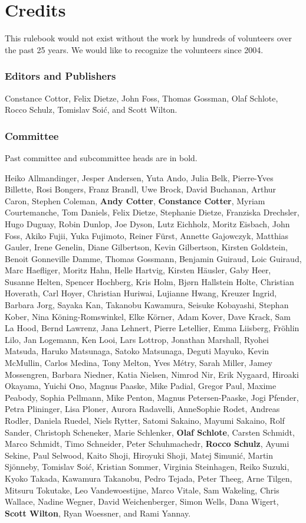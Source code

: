 \part{Credits}

This rulebook would not exist without the work by hundreds of volunteers over the past 25 years.
We would like to recognize the volunteers since 2004.

\section{Editors and Publishers}
Constance Cottor,
Felix Dietze,
John Foss,
Thomas Gossman,
Olaf Schlote,
Rocco Schulz,
Tomislav \u{S}oi\'{c},
and Scott Wilton.

\section{Committee}

Past committee and subcommittee heads are in bold.

Heiko Allmandinger,
Jesper Andersen,
Yuta Ando,
Julia Belk,
Pierre-Yves Billette,
Rosi Bongers,
Franz Brandl,
Uwe Brock,
David Buchanan,
Arthur Caron,
Stephen Coleman,
\textbf{Andy Cotter},
\textbf{Constance Cotter},
Myriam Courtemanche,
Tom Daniels,
Felix Dietze,
Stephanie Dietze,
Franziska Drechsler,
Hugo Duguay,
Robin Dunlop,
Joe Dyson,
Lutz Eichholz,
Moritz Eisbach,
John Foss,
Akiko Fujii,
Yuka Fujimoto,
Reiner Fürst,
Annette Gajowczyk,
Matthias Gauler,
Irene Genelin,
Diane Gilbertson,
Kevin Gilbertson,
Kirsten Goldstein,
Benoit Gonneville Damme,
Thomas Gossmann,
Benjamin Guiraud,
Loic Guiraud,
Marc Haefliger,
Moritz Hahn,
Helle Hartvig,
Kirsten H\"{a}usler,
Gaby Heer,
Susanne Helten,
Spencer Hochberg,
Kris Holm,
Bj{\o}rn Hallstein Holte,
Christian Hoverath,
Carl Hoyer,
Christian Huriwai,
Lujianne Hwang,
Kreuzer Ingrid,
Barbara Jorg,
Sayaka Kan,
Takanobu Kawamura,
Seisuke Kobayashi,
Stephan Kober,
Nina K\"{o}ning-Romswinkel,
Elke K\"{o}rner,
Adam Kover,
Dave Krack,
Sam La Hood,
Bernd Lawrenz,
Jana Lehnert,
Pierre Letellier,
Emma Liisberg,
Fröhlin Lilo,
Jan Logemann,
Ken Looi,
Lars Lottrop,
Jonathan Marshall,
Ryohei Matsuda,
Haruko Matsunaga,
Satoko Matsunaga,
Deguti Mayuko,
Kevin McMullin,
Carlos Medina,
Tony Melton,
Yves M\'{e}try,
Sarah Miller,
Jamey Mossengren,
Barbara Niedner,
Katia Nielsen,
Nimrod Nir,
Erik Nygaard,
Hiroaki Okayama,
Yuichi Ono,
Magnus Paaske,
Mike Padial,
Gregor Paul,
Maxime Peabody,
Sophia Pellmann,
Mike Penton,
Magnus Petersen-Paaske,
Jogi Pfender,
Petra Plininger,
Lisa Ploner,
Aurora Radavelli,
AnneSophie Rodet,
Andreas Rodler,
Daniela Ruedel,
Niels Rytter,
Satomi Sakaino,
Mayumi Sakaino,
Rolf Sander,
Christoph Scheneker,
Marie Schlenker,
\textbf{Olaf Schlote},
Carsten Schmidt,
Marco Schmidt,
Timo Schneider,
Peter Schuhmachedr,
\textbf{Rocco Schulz},
Ayumi Sekine,
Paul Selwood,
Kaito Shoji,
Hiroyuki Shoji,
Matej \u{S}imuni\'{c},
Martin Sjönneby,
Tomislav \u{S}oi\'{c},
Kristian Sommer,
Virginia Steinhagen,
Reiko Suzuki,
Kyoko Takada,
Kawamura Takanobu,
Pedro Tejada,
Peter Theeg,
Arne Tilgen,
Mitsuru Tokutake,
Leo Vandewoestijne,
Marco Vitale,
Sam Wakeling,
Chris Wallace,
Nadine Wegner,
David Weichenberger,
Simon Wells,
Dana Wigert,
\textbf{Scott Wilton},
Ryan Woessner,
and
Rami Yannay.